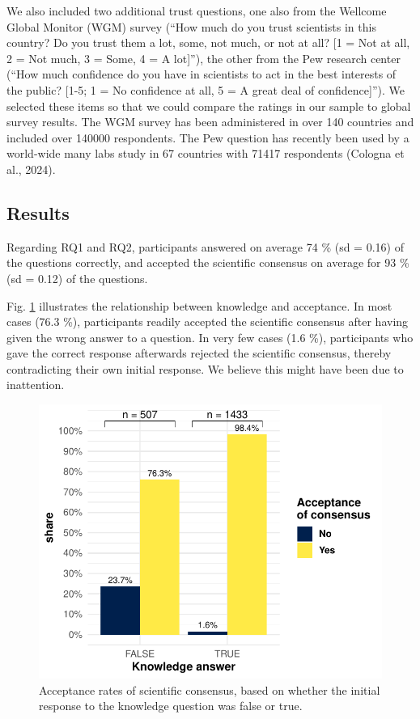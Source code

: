 \documentclass[
  doc,floatsintext]{apa6}
\begin{document}
We also included two additional trust questions, one also from the Wellcome Global Monitor (WGM) survey (``How much do you trust scientists in this country? Do you trust them a lot, some, not much, or not at all? {[}1 = Not at all, 2 = Not much, 3 = Some, 4 = A lot{]}''), the other from the Pew research center (``How much confidence do you have in scientists to act in the best interests of the public? {[}1-5; 1 = No confidence at all, 5 = A great deal of confidence{]}''). We selected these items so that we could compare the ratings in our sample to global survey results. The WGM survey has been administered in over 140 countries and included over 140000 respondents. The Pew question has recently been used by a world-wide many labs study in 67 countries with 71417 respondents (Cologna et al., 2024).

\subsection{Results}\label{results}

Regarding RQ1 and RQ2, participants answered on average 74 \% (sd = 0.16) of the questions correctly, and accepted the scientific consensus on average for 93 \% (sd = 0.12) of the questions.

Fig. \ref{fig:exp1-conditional-acceptance} illustrates the relationship between knowledge and acceptance. In most cases (76.3 \%), participants readily accepted the scientific consensus after having given the wrong answer to a question. In very few cases (1.6 \%), participants who gave the correct response afterwards rejected the scientific consensus, thereby contradicting their own initial response. We believe this might have been due to inattention.



\begin{figure}
\centering
\includegraphics{output/figures/exp1-conditional-acceptance.pdf}
\caption{\label{fig:exp1-conditional-acceptance}Acceptance rates of scientific consensus, based on whether the initial response to the knowledge question was false or true.}
\end{figure}
\end{document}
